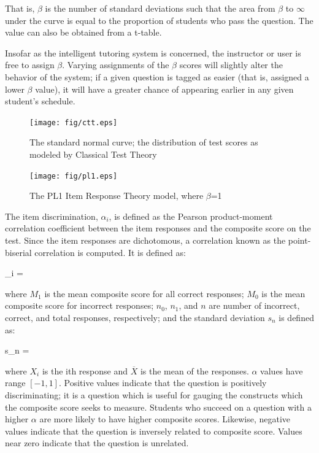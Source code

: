 That is, $\beta$ is the number of standard deviations such that the area from
$\beta$ to $\infty$ under the curve is equal to the proportion of students who
pass the question.  The value can also be obtained from a t-table.

Insofar as the intelligent tutoring system is concerned, the instructor or user
is free to assign $\beta$.  Varying assignments of the $\beta$ scores will
slightly alter the behavior of the system; if a given question is tagged as
easier (that is, assigned a lower $\beta$ value), it will have a greater chance
of appearing earlier in any given student's schedule.

\begin{figure}[p!]
 \label{fig:ctt}
 \texttt{[image: fig/ctt.eps]} 
 \caption{The standard normal curve; the distribution of test scores
  as modeled by Classical Test Theory}
\end{figure}

\begin{figure}[p!]
 \label{fig:pl1}
 \texttt{[image: fig/pl1.eps]} 
 \caption{The PL1 Item Response Theory model, where $\beta$=1}
\end{figure}


The item discrimination, $\alpha_i$, is defined as the Pearson product-moment
correlation coefficient between the item responses and the composite score on
the test.  Since the item responses are dichotomous, a correlation known as the
point-biserial correlation is computed.  It is defined as:

\begin{equations}
  \alpha_i =  
\end{equations}

where $M_1$ is the mean composite score for all correct responses; $M_0$ is the
mean composite score for incorrect responses; $n_0$, $n_1$, and $n$ are number
of incorrect, correct, and total responses, respectively; and the standard
deviation $s_n$ is defined as:

\begin{equations}
  s_n =  
\end{equations}

where $X_i$ is the ith response and $\overline{X}$ is the mean of the
responses.  $\alpha$ values have range $[-1, 1]$.  Positive values indicate
that the question is positively discriminating; it is a question which is
useful for gauging the constructs which the composite score seeks to measure.
Students who succeed on a question with a higher $\alpha$ are more likely to
have higher composite scores.  Likewise, negative values indicate that the
question is inversely related to composite score.  Values near zero indicate
that the question is unrelated.

